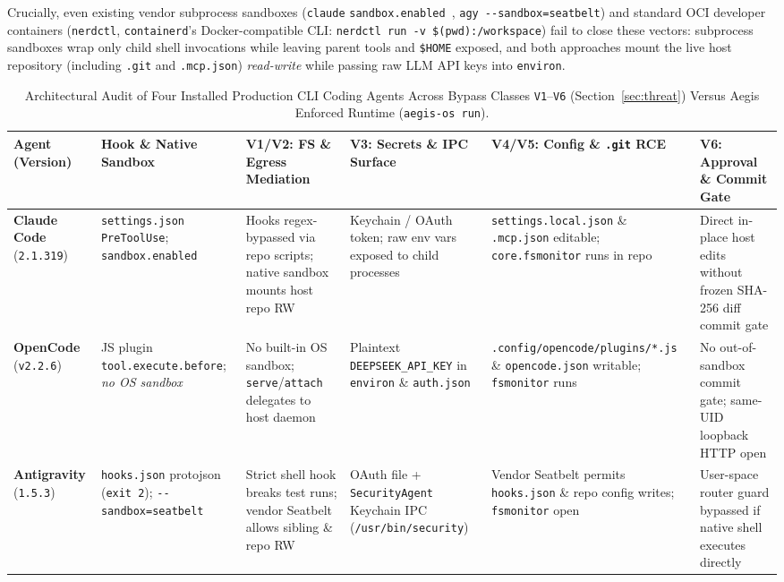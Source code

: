 \documentclass[10pt,journal,compsoc]{IEEEtran}
\begin{document}
Crucially, even existing vendor subprocess sandboxes (\texttt{claude} \texttt{sandbox.enabled}~\cite{anthropic2025srt}, \texttt{agy -\/-sandbox=seatbelt}) and standard OCI developer containers (\texttt{nerdctl}, \texttt{containerd}'s Docker-compatible CLI: \texttt{nerdctl run -v \$(pwd):/workspace}) fail to close these vectors: subprocess sandboxes wrap only child shell invocations while leaving parent tools and \texttt{\$HOME} exposed, and both approaches mount the live host repository (including \texttt{.git} and \texttt{.mcp.json}) \emph{read-write} while passing raw LLM API keys into \texttt{environ}.

\begin{table}[!t]
\centering
\caption{Architectural Audit of Four Installed Production CLI Coding Agents Across Bypass Classes \texttt{V1}--\texttt{V6} (Section~\ref{sec:threat}) Versus Aegis Enforced Runtime (\texttt{aegis-os run}).}
\label{tab:agent_audit}
\vspace{-4pt}
\scriptsize
\setlength{\tabcolsep}{3.1pt}
\begin{tabularx}{\textwidth}{@{}l>{\raggedright\arraybackslash}p{2.62cm}YYYY@{}}
\toprule
\textbf{Agent (Version)} & \textbf{Hook \& Native Sandbox} & \textbf{V1/V2: FS \& Egress Mediation} & \textbf{V3: Secrets \& IPC Surface} & \textbf{V4/V5: Config \& \texttt{.git} RCE} & \textbf{V6: Approval \& Commit Gate} \\
\midrule
\textbf{Claude Code} (\texttt{2.1.319}) & \texttt{settings.json} \texttt{PreToolUse}; \texttt{sandbox.\allowbreak enabled}~\cite{anthropic2025srt} & Hooks regex-bypassed via repo scripts; native sandbox mounts host repo RW & Keychain / OAuth token; raw env vars exposed to child processes & \texttt{settings.\allowbreak local.json} \& \texttt{.mcp.json} editable; \texttt{core.\allowbreak fsmonitor} runs in repo & Direct in-place host edits without frozen SHA-256 diff commit gate \\
\addlinespace[2pt]
\textbf{OpenCode} (\texttt{v2.2.6}) & JS plugin \texttt{tool.\allowbreak execute.\allowbreak before}; \emph{no OS sandbox} & No built-in OS sandbox; \texttt{serve}/\texttt{attach} delegates to host daemon & Plaintext \texttt{DEEPSEEK\_\allowbreak API\_KEY} in \texttt{environ} \& \texttt{auth.json} & \texttt{.config/opencode/\allowbreak plugins/*.js} \& \texttt{opencode.json} writable; \texttt{fsmonitor} runs & No out-of-sandbox commit gate; same-UID loopback HTTP open \\
\addlinespace[2pt]
\textbf{Antigravity} (\texttt{1.5.3}) & \texttt{hooks.json} protojson (\texttt{exit 2}); \texttt{-\/-sandbox=\allowbreak seatbelt} & Strict shell hook breaks test runs; vendor Seatbelt allows sibling \& repo RW & OAuth file + \texttt{Security\allowbreak Agent} Keychain IPC (\texttt{/usr/\allowbreak bin/security}) & Vendor Seatbelt permits \texttt{hooks.json} \& repo config writes; \texttt{fsmonitor} open & User-space router guard bypassed if native shell executes directly \\

\end{tabularx}
\end{table}
\end{document}
